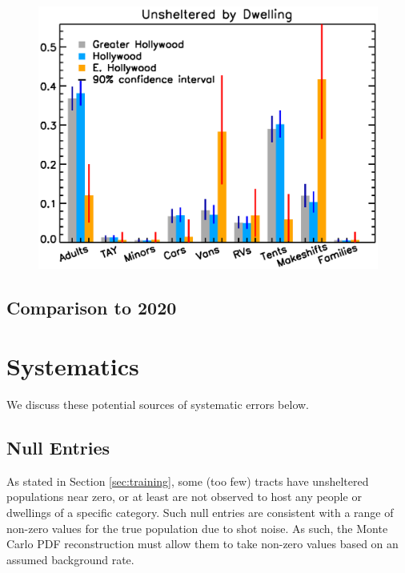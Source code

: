 \documentclass[11pt,twocolumn]{article}
\begin{document}
\begin{figure}[h]
	\centering
	\includegraphics[width =\linewidth]{allTracts/allBreakdownBar}
	\caption{}
\end{figure}

\subsection{Comparison to 2020}
\label{sec:comp}

\section{Systematics}
\label{sec:systematics}

We discuss these potential sources of systematic errors below.

\subsection{Null Entries}
\label{sec:nulls}

As stated in Section \ref{sec:training}, some (too few) tracts have unsheltered populations near zero, 
or at least are not observed to host any people or dwellings of a specific category. Such null entries 
are consistent with a range of non-zero values for the true population due to shot noise. As such, the 
Monte Carlo PDF reconstruction must allow them to take non-zero values based on an assumed background
rate. 
\end{document}
